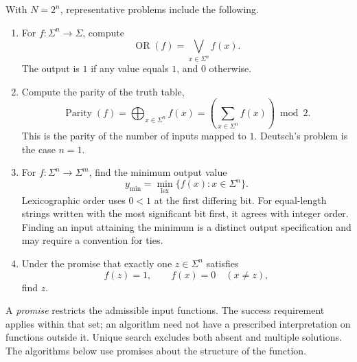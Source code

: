 \documentclass[11pt,oneside,openany]{book}
\theoremstyle{definition}
\begin{document}
With $N=2^n$, representative problems include the following.
\begin{enumerate}
\item For $f:\Sigma^n\to\Sigma$, compute
\begin{equation}
 \operatorname{OR}(f)=\bigvee_{x\in\Sigma^n}f(x).
\end{equation}
The output is $1$ if any value equals $1$, and $0$ otherwise.
\item Compute the parity of the truth table,
\begin{equation}
 \operatorname{Parity}(f)=\bigoplus_{x\in\Sigma^n}f(x)
 =\left(\sum_{x\in\Sigma^n}f(x)\right)\bmod2.
\end{equation}
This is the parity of the number of inputs mapped to $1$. Deutsch's problem is the case $n=1$.
\item For $f:\Sigma^n\to\Sigma^m$, find the minimum output value
\begin{equation}
 y_{\min}=\min_{\mathrm{lex}}\{f(x):x\in\Sigma^n\}.
\end{equation}
Lexicographic order uses $0<1$ at the first differing bit. For equal-length strings written with the most significant bit first, it agrees with integer order. Finding an input attaining the minimum is a distinct output specification and may require a convention for ties.
\item Under the promise that exactly one $z\in\Sigma^n$ satisfies
\begin{equation}
 f(z)=1,\qquad f(x)=0\quad(x\ne z),
\end{equation}
find $z$.
\end{enumerate}
A \emph{promise} restricts the admissible input functions. The success requirement applies within that set; an algorithm need not have a prescribed interpretation on functions outside it. Unique search excludes both absent and multiple solutions. The algorithms below use promises about the structure of the function.
\end{document}
